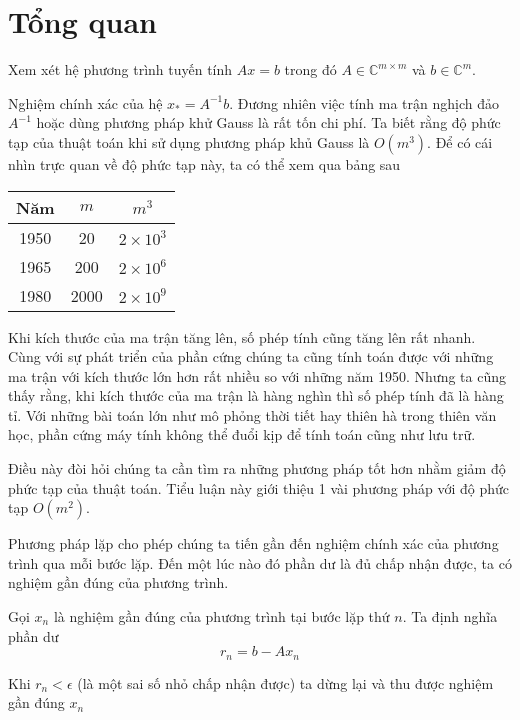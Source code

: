 \chapter{Tổng quan}
Xem xét hệ phương trình tuyến tính $Ax=b$ trong đó $A \in \mathbb{C} ^{m \times m}$ 
và $b \in \mathbb{C}^m$.

Nghiệm chính xác của hệ $x_* = A^{-1}b$. Đương nhiên việc tính ma trận nghịch đảo $A^{-1}$
hoặc dùng phương pháp khử Gauss là rất tốn chi phí. Ta biết rằng độ phức tạp của thuật 
toán khi sử dụng phương pháp khủ Gauss là $O(m^3)$. Để có cái nhìn trực quan về độ phức tạp 
này, ta có thể xem qua bảng sau 

\begin{center}
    \begin{tabular}{| c | c | c |}
        \hline
        Năm & $m$ & $m^3$ \\ 
        \hline
        1950 & 20 & $2 \times 10^3$ \\
        1965 & 200 & $2 \times 10^6$ \\
        1980 & 2000 & $2 \times 10^9$ \\
        \hline
    \end{tabular}
\end{center}

Khi kích thước của ma trận tăng lên, số phép tính cũng tăng lên rất nhanh. Cùng với sự phát triển của 
phần cứng chúng ta cũng tính toán được với những ma trận với kích thước lớn hơn rất nhiều so với những
năm 1950. Nhưng ta cũng thấy rằng, khi kích thước của ma trận là hàng nghìn thì số phép tính đã là 
hàng tỉ. Với những bài toán lớn như mô phỏng thời tiết hay thiên hà trong thiên văn học, phần cứng 
máy tính không thể đuổi kịp để tính toán cũng như lưu trữ.

Điều này đòi hỏi chúng ta cần tìm ra những phương pháp tốt hơn nhằm giảm độ phức tạp của thuật toán.
Tiểu luận này giới thiệu 1 vài phương pháp với độ phức tạp $O(m^2)$.

Phương pháp lặp cho phép chúng ta tiến gần đến nghiệm chính xác của phương trình qua mỗi bước lặp.
Đến một lúc nào đó phần dư là đủ chấp nhận được, ta có nghiệm gần đúng của phương trình.

Gọi $x_n$ là nghiệm gần đúng của phương trình tại bước lặp thứ $n$. Ta định nghĩa phần dư
\begin{equation}
    r_n = b - Ax_n
\end{equation}

Khi $r_n < \epsilon$ (là một sai số nhỏ chấp nhận được) ta dừng lại và thu được nghiệm gần đúng $x_n$

